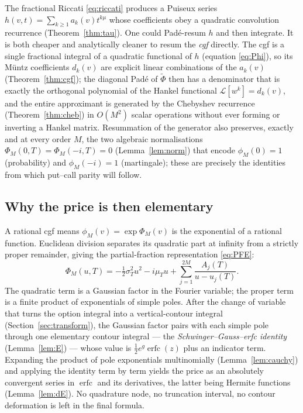 \documentclass[11pt]{article}
\newcommand{\Lc}{\mathcal{L}}
\DeclareMathOperator{\erfc}{erfc}
\begin{document}
The fractional Riccati \eqref{eq:riccati} produces a Puiseux series
$h(v,t)=\sum_{k\ge1}a_k(v)t^{k\mu}$ whose coefficients obey a quadratic
convolution recurrence (Theorem~\ref{thm:tau}). One could Pad\'e-resum
$h$ and then integrate. It is both cheaper and analytically cleaner to
resum the \emph{cgf} directly. The cgf is a single fractional integral of a
quadratic functional of $h$ (equation \eqref{eq:Phi}), so its M\"untz
coefficients $d_k(v)$ are explicit linear combinations of the $a_k(v)$
(Theorem~\ref{thm:cgf}); the diagonal Pad\'e of $\widetilde\Phi$ then has a
denominator that is exactly the orthogonal polynomial of the Hankel
functional $\Lc[w^k]=d_k(v)$, and the entire approximant is generated by the
Chebyshev recurrence (Theorem~\ref{thm:cheb}) in $O(M^2)$ scalar operations
without ever forming or inverting a Hankel matrix. Resummation of the
generator also preserves, exactly and at every order $M$, the two algebraic
normalisations $\Phi_M(0,T)=\Phi_M(-i,T)=0$ (Lemma~\ref{lem:norm}) that
encode $\phi_M(0)=1$ (probability) and $\phi_M(-i)=1$ (martingale); these
are precisely the identities from which put--call parity will follow.

\subsection{Why the price is then elementary}

A rational cgf means $\phi_M(v)=\exp\Phi_M(v)$ is the exponential of a
rational function. Euclidean division separates its quadratic part at
infinity from a strictly proper remainder, giving the partial-fraction
representation \eqref{eq:PFE}:
\[
\Phi_M(u,T)=-\tfrac12\sigma_T^2u^2-i\mu_T u
+\sum_{j=1}^{2M}\frac{A_j(T)}{u-u_j(T)} .
\]
The quadratic term is a Gaussian factor in the Fourier variable; the proper
term is a finite product of exponentials of simple poles. After the change
of variable that turns the option integral into a vertical-contour integral
(Section~\ref{sec:transform}), the Gaussian factor pairs with each simple
pole through one elementary contour integral --- the
\emph{Schwinger--Gauss--erfc identity} (Lemma~\ref{lem:E}) --- whose value
is $\tfrac12 e^{g}\erfc(z)$ plus an indicator term. Expanding the product of
pole exponentials multinomially (Lemma~\ref{lem:cauchy}) and applying the
identity term by term yields the price as an absolutely convergent series
in $\erfc$ and its derivatives, the latter being Hermite functions
(Lemma~\ref{lem:dE}). No quadrature node, no truncation interval, no
contour deformation is left in the final formula.
\end{document}

